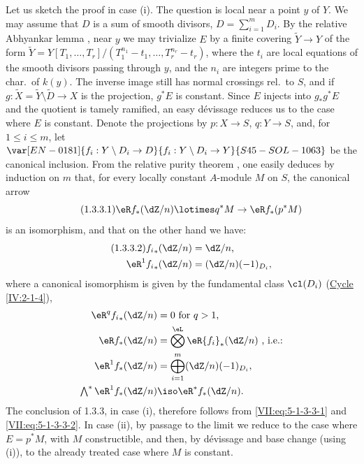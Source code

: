 Let us sketch the proof in case (i). The question is local near a point $y$
of $Y$. We may assume that $D$ is a sum of smooth divisors,
$D=\sum_{i=1}^m D_i$. By the relative Abhyankar lemma
, near $y$ we may trivialize $E$ by a finite covering
$\widetilde Y\to Y$ of the form
$\widetilde Y=Y[T_1,\dots,T_r]/(T_1^{n_1}-t_1,\dots,T_r^{n_r}-t_r)$, where the
$t_i$ are local equations of the smooth divisors passing through $y$, and the
$n_i$ are integers prime to the char.\ of $k(y)$. The inverse image
 still has normal crossings rel.\ to $S$, and
if $g:\widetilde X=\widetilde Y\setminus \widetilde D\to X$ is the projection,
$g^\ast E$ is constant. Since $E$ injects into $g_\ast g^\ast E$ and the
quotient is tamely ramified, an easy dévissage reduces us to the case where
$E$ is constant. Denote the projections by $p:X\to S$, $q:Y\to S$, and, for
$1\leqslant i\leqslant m$, let $\var[EN-0181]{f_i:Y\setminus D_i \to D}{f_i:Y\setminus D_i \to Y}{S45-SOL-1063}$ be the canonical
inclusion. From the relative purity theorem , one easily
deduces by induction on $m$ that, for every locally constant $A$-module $M$ on
$S$, the canonical arrow
\begin{equation*}\tag{1.3.3.1}\label{VII:eq:5-1-3-3-1} %
  \eR f_\ast (\dZ/n)\lotimes q^\ast M\to \eR f_\ast (p^\ast M) 
\end{equation*}
is an isomorphism, and that on the other hand we have:
\begin{align*}\tag{1.3.3.2}\label{VII:eq:5-1-3-3-2}
  {f_i}_\ast(\dZ/n) &= \dZ/n \text{,} \\
  \eR^1 {f_i}_\ast (\dZ/n) &= (\dZ/n)(-1)_{D_i} \text{,} 
\end{align*}
where a canonical isomorphism is given by the fundamental class $\cl(D_i)$
(\hyperref[IV]{Cycle} \ref{IV:2-1-4}),
\begin{align*}
  \eR^q {f_i}_\ast(\dZ/n) &= 0\text{ for $q>1$,} \\
  \eR f_\ast (\dZ/n) &= \bigotimes^\eL \eR {f_i}_\ast (\dZ/n) \text{ , i.e.:} \\
  \eR^1 f_\ast(\dZ/n) &= \bigoplus_{i=1}^m (\dZ/n)(-1)_{D_i} \text{,} \\
  \textstyle\bigwedge^\ast \eR^1 f_\ast(\dZ/n) &\iso \eR^\ast f_\ast (\dZ/n) \text{.} 
\end{align*}
The conclusion of 1.3.3, in case (i), therefore follows from
\eqref{VII:eq:5-1-3-3-1} and \eqref{VII:eq:5-1-3-3-2}. In case (ii), by
passage to the limit we reduce to the case where $E=p^\ast M$, with $M$
constructible, and then, by dévissage and base change (using (i)), to the
already treated case where $M$ is constant.

